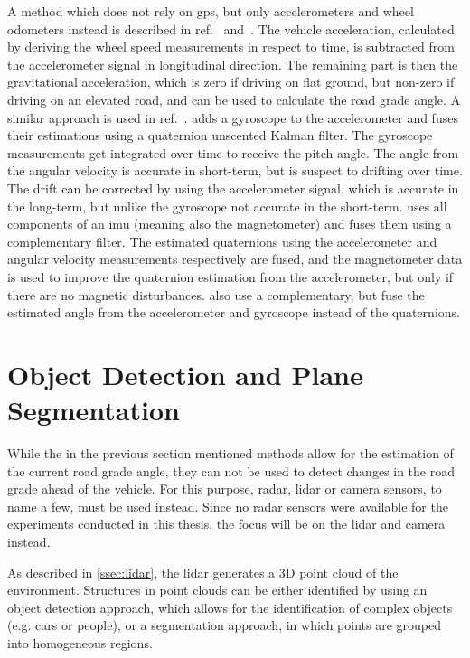 A method which does not rely on \gls{gps}, but only accelerometers and wheel odometers instead is described in ref.~\cite{Nilsson2012} and~\cite{Palella2016}.
The vehicle acceleration, calculated by deriving the wheel speed measurements in respect to time, is subtracted from the accelerometer signal in longitudinal direction.
The remaining part is then the gravitational acceleration, which is zero if driving on flat ground, but non-zero if driving on an elevated road, and can be used to calculate the road grade angle.
A similar approach is used in ref.~\cite{Sentouh2008}.
\cite{He2020} adds a gyroscope to the accelerometer and fuses their estimations using a quaternion unscented Kalman filter.
The gyroscope measurements get integrated over time to receive the pitch angle.
The angle from the angular velocity is accurate in short-term, but is suspect to drifting over time.
The drift can be corrected by using the accelerometer signal, which is accurate in the long-term, but unlike the gyroscope not accurate in the short-term.
\cite{Wu2016} uses all components of an \gls{imu} (meaning also the magnetometer) and fuses them using a complementary filter.
The estimated quaternions using the accelerometer and angular velocity measurements respectively are fused, and the magnetometer data is used to improve the quaternion estimation from the accelerometer, but only if there are no magnetic disturbances.
\cite{Euston2008} also use a complementary, but fuse the estimated angle from the accelerometer and gyroscope instead of the quaternions.



\section[Plane segmentation]{Object Detection and Plane Segmentation}
While the in the previous section mentioned methods allow for the estimation of the current road grade angle, they can not be used to detect changes in the road grade ahead of the vehicle.
For this purpose, \gls{radar}, \gls{lidar} or camera sensors, to name a few, must be used instead.
Since no \gls{radar} sensors were available for the experiments conducted in this thesis, the focus will be on the \gls{lidar} and camera instead.

As described in \cref{ssec:lidar}, the \gls{lidar} generates a 3D point cloud of the environment.
Structures in point clouds can be either identified by using an object detection approach, which allows for the identification of complex objects (e.g. cars or people), or a segmentation approach, in which points are grouped into homogeneous regions.

